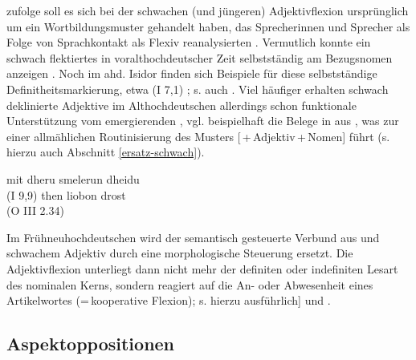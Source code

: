 \textcite[361--364]{Braunmuller2008} zufolge soll es sich bei der schwachen (und jüngeren) Adjektivflexion ursprünglich um ein Wortbildungsmuster gehandelt haben, das Sprecherinnen und Sprecher als Folge von Sprachkontakt als Flexiv reanalysierten  \parencite[zu alternativen Entstehungsszenarien s.][13--26]{Kovari1984}. Vermutlich konnte ein schwach flektiertes   in voralthochdeutscher Zeit selbstständig  am Bezugsnomen anzeigen 
\parencites()()[69]{Demske2001}[364]{Braunmuller2008}. Noch im ahd. Isidor finden sich Beispiele für diese selbstständige Definitheitsmarkierung,  etwa   (I 7,1) \parencite[226]{Braune2004}; s. auch \textcite[69--70]{Demske2001}. 
Viel häufiger erhalten schwach deklinierte Adjektive im Althochdeutschen allerdings schon funktionale Unterstützung vom emergierenden , vgl. beispielhaft die Belege in  aus \textcite[24,28]{Schrodt2004}, was zur einer allmählichen Routinisierung des Musters [\,+\,Adjektiv\,+\,Nomen] führt (s. hierzu auch Abschnitt \ref{ersatz-schwach}).

\begin{exe}
	\ex \label{ex:art-adj}   
	\begin{xlist}
		\ex \label{ex:art-adj1} mit dheru smelerun dheidu \\    (I 9,9) 
		\ex \label{ex:art-adj2} then liobon drost  \\  (O III 2.34)
		\end{xlist}
\end{exe}
 
Im Frühneuhochdeutschen wird der semantisch gesteuerte Verbund aus  und schwachem Adjektiv durch eine morphologische Steuerung ersetzt. Die Adjektivflexion unterliegt dann nicht mehr der definiten  oder indefiniten Lesart  des nominalen Kerns, sondern reagiert auf die An- oder Abwesenheit eines Artikelwortes  (=\,kooperative Flexion); s. hierzu ausführlich]\textcite{Demske2001} und \textcite{Szczepaniak2011a}. 

\subsection{Aspektoppositionen} \label{sec:aspektoppo}

